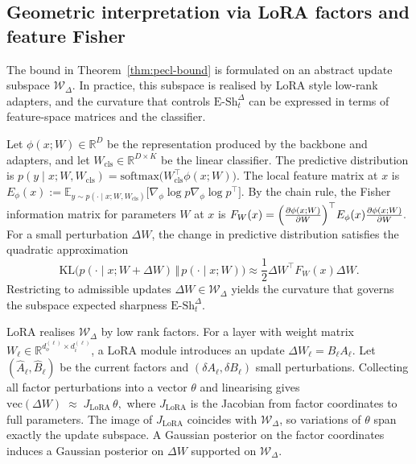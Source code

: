 \documentclass{article}
\theoremstyle{plain}
\theoremstyle{definition}
\theoremstyle{remark}
\begin{document}
\subsection{Geometric interpretation via LoRA factors and feature Fisher}
\label{sec:geometry-lora-pecl}

The bound in Theorem~\ref{thm:pecl-bound} is formulated on an abstract update subspace $\mathcal W_\Delta$. In practice, this subspace is realised by LoRA style low-rank adapters, and the curvature that controls $\mathrm{E\text{-}Sh}_t^\Delta$ can be expressed in terms of feature-space matrices and the classifier.

Let $\phi(x;W)\in\mathbb R^D$ be the representation produced by the backbone and adapters, and let $W_{\mathrm{cls}}\in\mathbb R^{D\times K}$ be the linear classifier. The predictive distribution is
$
p(y\mid x;W,W_{\mathrm{cls}})
=
\mathrm{softmax}\bigl(W_{\mathrm{cls}}^\top \phi(x;W)\bigr).
$
The local feature matrix at $x$ is
$
E_\phi(x)
:=
\mathbb E_{y\sim p(\cdot\mid x;W,W_{\mathrm{cls}})}
\bigl[
\nabla_\phi \log p
\nabla_\phi \log p^\top
\bigr]. 
$\cite{EFC2024} By the chain rule, the Fisher information matrix for parameters $W$ at $x$ is
$
F_W(x)
=
\Bigl(
\frac{\partial \phi(x;W)}{\partial W}
\Bigr)^\top
E_\phi(x)
\frac{\partial \phi(x;W)}{\partial W}.
$
For a small perturbation $\Delta W$, the change in predictive distribution satisfies the quadratic approximation
$$
\mathrm{KL}\bigl(p(\cdot\mid x;W+\Delta W)\,\Vert\,p(\cdot\mid x;W)\bigr)
\approx
\frac12\Delta W^\top F_W(x)\Delta W.
$$
Restricting to admissible updates $\Delta W\in\mathcal W_\Delta$ yields the curvature that governs the subspace expected sharpness $\mathrm{E\text{-}Sh}_t^\Delta$.

LoRA realises $\mathcal W_\Delta$ by low rank factors. For a layer with weight matrix $W_\ell \in \mathbb R^{d_o^{(\ell)}\times d_i^{(\ell)}}$, a LoRA module introduces an update
$
\Delta W_\ell = B_\ell A_\ell.
$ Let $(\widehat A_\ell,\widehat B_\ell)$ be the current factors and $(\delta A_\ell,\delta B_\ell)$ small perturbations. Collecting all factor perturbations into a vector $\theta$ and linearising gives
$
\mathrm{vec}(\Delta W)
\;\approx\;
J_{\mathrm{LoRA}}\,\theta,
$
where $J_{\mathrm{LoRA}}$ is the Jacobian from factor coordinates to full parameters. The image of $J_{\mathrm{LoRA}}$ coincides with $\mathcal W_\Delta$, so variations of $\theta$ span exactly the update subspace. A Gaussian posterior on the factor coordinates induces a Gaussian posterior on $\Delta W$ supported on $\mathcal W_\Delta$.
\end{document}
